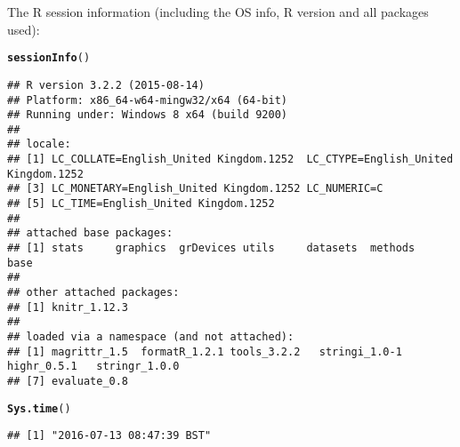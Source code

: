 \documentclass{article}\usepackage[]{graphicx}\usepackage[]{color}
\makeatletter
\newcommand{\hlstd}[1]{\textcolor[rgb]{0.345,0.345,0.345}{#1}}%
\newcommand{\hlkwd}[1]{\textcolor[rgb]{0.737,0.353,0.396}{\textbf{#1}}}%
\newenvironment{kframe}{%
 \def\at@end@of@kframe{}%
 \ifinner\ifhmode%
  \def\at@end@of@kframe{\end{minipage}}%
  \begin{minipage}{\columnwidth}%
 \fi\fi%
 \def\FrameCommand##1{\hskip\@totalleftmargin \hskip-\fboxsep
 \colorbox{shadecolor}{##1}\hskip-\fboxsep
     \hskip-\linewidth \hskip-\@totalleftmargin \hskip\columnwidth}%
 \MakeFramed {\advance\hsize-\width
   \@totalleftmargin\z@ \linewidth\hsize
   \@setminipage}}%
 {\par\unskip\endMakeFramed%
 \at@end@of@kframe}
\newenvironment{knitrout}{}{} %
\makeatother
\begin{document}
The R session information (including the OS info, R version and all
packages used):

\begin{knitrout}
\color{fgcolor}\begin{kframe}
\begin{alltt}
\hlkwd{sessionInfo}\hlstd{()}
\end{alltt}
\begin{verbatim}
## R version 3.2.2 (2015-08-14)
## Platform: x86_64-w64-mingw32/x64 (64-bit)
## Running under: Windows 8 x64 (build 9200)
## 
## locale:
## [1] LC_COLLATE=English_United Kingdom.1252  LC_CTYPE=English_United Kingdom.1252   
## [3] LC_MONETARY=English_United Kingdom.1252 LC_NUMERIC=C                           
## [5] LC_TIME=English_United Kingdom.1252    
## 
## attached base packages:
## [1] stats     graphics  grDevices utils     datasets  methods   base     
## 
## other attached packages:
## [1] knitr_1.12.3
## 
## loaded via a namespace (and not attached):
## [1] magrittr_1.5  formatR_1.2.1 tools_3.2.2   stringi_1.0-1 highr_0.5.1   stringr_1.0.0
## [7] evaluate_0.8
\end{verbatim}
\begin{alltt}
\hlkwd{Sys.time}\hlstd{()}
\end{alltt}
\begin{verbatim}
## [1] "2016-07-13 08:47:39 BST"
\end{verbatim}
\end{kframe}
\end{knitrout}
\end{document}
